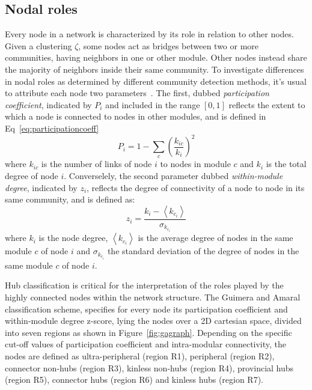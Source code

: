 \subsection{Nodal roles}
Every node in a network is characterized by its role in relation to other nodes. Given a clustering $\zeta$, some nodes act as bridges between two or more communities, having neighbors in one or other module. Other nodes instead share the majority of neighbors inside their same community.
To investigate differences in nodal roles as determined by different community detection methods, it's usual to attribute each node two parameters~\cite{guimera2005}.
The first, dubbed \emph{participation coefficient}, indicated by $P_i$ and included in the range $[0,1]$ reflects the extent to which a node is connected to nodes in other modules, and is defined in Eq~\ref{eq:participationcoeff} 
\begin{equation}\label{eq:participationcoeff}
P_i = 1 - \sum_c \left( \frac{k_{ic}}{k_i} \right)^2
\end{equation}
where $k_{ic}$ is the number of links of node $i$ to nodes in module $c$ and $k_i$ is the total degree of node $i$.
Converselely, the second parameter dubbed \emph{within-module degree}, indicated by $z_i$,  reflects the degree of connectivity of a node to node in its same community, and is defined as: 
\begin{equation}\label{eq:withinmoduledegree}
z_i = \frac{k_i - \left< k_{c_i} \right>}{\sigma_{k_{c_i}}}
\end{equation}
where $k_i$ is the node degree,  $\left< k_{c_i} \right>$ is the average degree of nodes in the same module $c$ of node $i$ and $\sigma_{k_{c_i}}$ the standard deviation of the degree of nodes in the same module $c$ of node $i$.

Hub classification is critical for the interpretation of the roles played by the highly connected nodes within the network structure.
The Guimera and Amaral~\cite{guimera2005} classification scheme, specifies for every node its participation coefficient and within-module degree z-score, lying the nodes over a 2D cartesian space, divided into seven regions as shown in Figure~\ref{fig:gagraph}.
Depending on the specific cut-off values of participation coefficient and intra-modular connectivity, the nodes are defined as ultra-peripheral (region R1), peripheral (region R2), connector non-hubs (region R3), kinless non-hubs (region R4), provincial hubs (region R5), connector hubs (region R6) and kinless hubs (region R7). 

